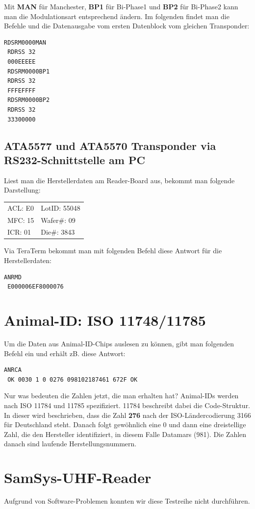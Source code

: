 \documentclass[paper=a4,fontsize=11pt,headsepline,footsepline,parskip=half]{scrartcl}
\begin{document}
Mit \textbf{MAN} für \glqq Manchester\grqq{}, \textbf{BP1} für \glqq Bi-Phase1\grqq{} und \textbf{BP2} für \glqq Bi-Phase2\grqq{} kann
man die Modulationsart entsprechend ändern. Im folgenden findet man die Befehle und die Datenausgabe vom ersten Datenblock vom gleichen
Transponder:

\begin{lstlisting}[caption={Modulationsart ändern und Ausgabe anzeigen.}]
 RDSRM0000MAN
 RDRSS 32
 000EEEEE
 RDSRM0000BP1
 RDRSS 32
 FFFEFFFF
 RDSRM0000BP2
 RDRSS 32
 33300000
\end{lstlisting}

\subsection{ATA5577 und ATA5570 Transponder via RS232-Schnittstelle am PC}

Liest man die Herstellerdaten am Reader-Board aus, bekommt man folgende Darstellung:

\begin{tabular}{ll}
 ACL: E0 & LotID: 55048\\
 MFC: 15 & Wafer\#: 09\\
 ICR: 01 & Die\#: 3843
\end{tabular}

Via TeraTerm bekommt man mit folgenden Befehl diese Antwort für die Herstellerdaten:

\begin{lstlisting}[caption={Herstellerdaten auslesen.}]
 ANRMD
 E000006EF8000076
\end{lstlisting}

\section{Animal-ID: ISO 11748/11785}

Um die Daten aus Animal-ID-Chips auslesen zu können, gibt man folgenden Befehl ein und erhält zB. diese Antwort:

\begin{lstlisting}[caption={Animal-ID-Abfrage.}]
 ANRCA
 OK 0030 1 0 0276 098102187461 672F OK
\end{lstlisting}

Nur was bedeuten die Zahlen jetzt, die man erhalten hat? Animal-IDs werden nach ISO 11784 und 11785 spezifiziert. 11784 beschreibt dabei
die Code-Struktur. In dieser wird beschrieben, dass die Zahl \textbf{276} nach der ISO-Ländercodierung 3166 für Deutschland steht. Danach
folgt gewöhnlich eine 0 und dann eine dreistellige Zahl, die den Hersteller identifiziert, in diesem Falle Datamars (981). Die Zahlen danach
sind laufende Herstellungsnummern.

\section{SamSys-UHF-Reader}

Aufgrund von Software-Problemen konnten wir diese Testreihe nicht durchführen.
\end{document}
